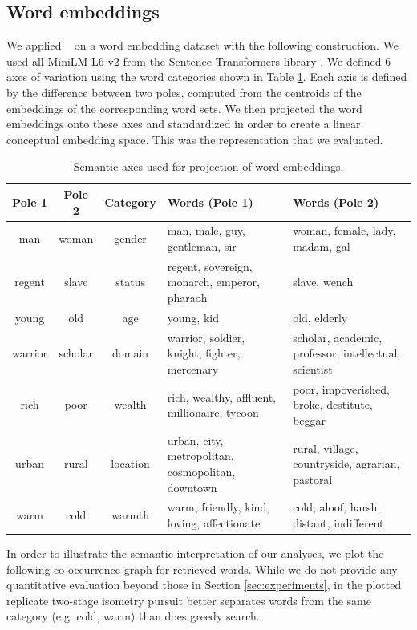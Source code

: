 \newpage

\subsection{Word embeddings}
\label{sec:word_embeddings}

We applied \isometrypursuit~ on a word embedding dataset with the following construction.
We used all-MiniLM-L6-v2 from the Sentence Transformers library \citep{reimers-2019-sentence-bert}.
We defined $6$ axes of variation using the word categories shown in Table \ref{tab:semantic_axes}.
Each axis is defined by the difference between two poles, computed from the centroids of the embeddings of the corresponding word sets.
We then projected the word embeddings onto these axes and standardized in order to create a linear conceptual embedding space.
This was the representation that we evaluated.

\begin{table}[t]
\centering
\begin{tabular}{|c|c|c|p{5cm}|p{5cm}|}
\hline
\textbf{Pole 1} & \textbf{Pole 2} & \textbf{Category} & \textbf{Words (Pole 1)} & \textbf{Words (Pole 2)} \\
\hline
man     & woman     & gender   & man, male, guy, gentleman, sir & woman, female, lady, madam, gal \\
regent  & slave     & status   & regent, sovereign, monarch, emperor, pharaoh & slave, wench \\
young   & old       & age      & young, kid & old, elderly \\
warrior & scholar   & domain   & warrior, soldier, knight, fighter, mercenary & scholar, academic, professor, intellectual, scientist \\
rich    & poor      & wealth   & rich, wealthy, affluent, millionaire, tycoon & poor, impoverished, broke, destitute, beggar \\
urban   & rural     & location & urban, city, metropolitan, cosmopolitan, downtown & rural, village, countryside, agrarian, pastoral \\
warm    & cold      & warmth   & warm, friendly, kind, loving, affectionate & cold, aloof, harsh, distant, indifferent \\
\hline
\end{tabular}
\caption{Semantic axes used for projection of word embeddings. }
\label{tab:semantic_axes}
\end{table}

In order to illustrate the semantic interpretation of our analyses, we plot the following co-occurrence graph for retrieved words.
While we do not provide any quantitative evaluation beyond those in Section \ref{sec:experiments}, in the plotted replicate two-stage isometry pursuit better separates words from the same category (e.g. cold, warm) than does greedy search.

